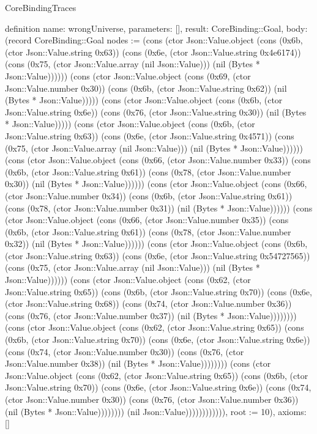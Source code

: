 \begin{lexlean}{CoreBindingTraces}
\begin{semanticmodule}
definition{
 name: wrongUniverse,
 parameters: [],
 result: CoreBinding::Goal,
 body: (record CoreBinding::Goal {nodes := (cons (ctor Json::Value.object (cons (0x6b, (ctor Json::Value.string 0x63)) (cons (0x6e, (ctor Json::Value.string 0x4e6174)) (cons (0x75, (ctor Json::Value.array (nil Json::Value))) (nil (Bytes * Json::Value)))))) (cons (ctor Json::Value.object (cons (0x69, (ctor Json::Value.number 0x30)) (cons (0x6b, (ctor Json::Value.string 0x62)) (nil (Bytes * Json::Value))))) (cons (ctor Json::Value.object (cons (0x6b, (ctor Json::Value.string 0x6e)) (cons (0x76, (ctor Json::Value.string 0x30)) (nil (Bytes * Json::Value))))) (cons (ctor Json::Value.object (cons (0x6b, (ctor Json::Value.string 0x63)) (cons (0x6e, (ctor Json::Value.string 0x4571)) (cons (0x75, (ctor Json::Value.array (nil Json::Value))) (nil (Bytes * Json::Value)))))) (cons (ctor Json::Value.object (cons (0x66, (ctor Json::Value.number 0x33)) (cons (0x6b, (ctor Json::Value.string 0x61)) (cons (0x78, (ctor Json::Value.number 0x30)) (nil (Bytes * Json::Value)))))) (cons (ctor Json::Value.object (cons (0x66, (ctor Json::Value.number 0x34)) (cons (0x6b, (ctor Json::Value.string 0x61)) (cons (0x78, (ctor Json::Value.number 0x31)) (nil (Bytes * Json::Value)))))) (cons (ctor Json::Value.object (cons (0x66, (ctor Json::Value.number 0x35)) (cons (0x6b, (ctor Json::Value.string 0x61)) (cons (0x78, (ctor Json::Value.number 0x32)) (nil (Bytes * Json::Value)))))) (cons (ctor Json::Value.object (cons (0x6b, (ctor Json::Value.string 0x63)) (cons (0x6e, (ctor Json::Value.string 0x54727565)) (cons (0x75, (ctor Json::Value.array (nil Json::Value))) (nil (Bytes * Json::Value)))))) (cons (ctor Json::Value.object (cons (0x62, (ctor Json::Value.string 0x65)) (cons (0x6b, (ctor Json::Value.string 0x70)) (cons (0x6e, (ctor Json::Value.string 0x68)) (cons (0x74, (ctor Json::Value.number 0x36)) (cons (0x76, (ctor Json::Value.number 0x37)) (nil (Bytes * Json::Value)))))))) (cons (ctor Json::Value.object (cons (0x62, (ctor Json::Value.string 0x65)) (cons (0x6b, (ctor Json::Value.string 0x70)) (cons (0x6e, (ctor Json::Value.string 0x6e)) (cons (0x74, (ctor Json::Value.number 0x30)) (cons (0x76, (ctor Json::Value.number 0x38)) (nil (Bytes * Json::Value)))))))) (cons (ctor Json::Value.object (cons (0x62, (ctor Json::Value.string 0x65)) (cons (0x6b, (ctor Json::Value.string 0x70)) (cons (0x6e, (ctor Json::Value.string 0x6e)) (cons (0x74, (ctor Json::Value.number 0x30)) (cons (0x76, (ctor Json::Value.number 0x36)) (nil (Bytes * Json::Value)))))))) (nil Json::Value)))))))))))), root := 10}),
 axioms: []
}


\end{semanticmodule}
\end{lexlean}
